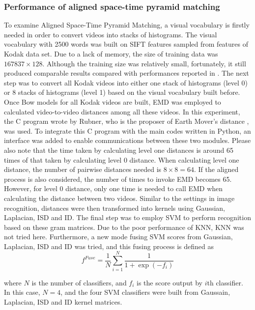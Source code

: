 \subsubsection{Performance of aligned space-time pyramid matching}
To examine Aligned Space-Time Pyramid Matching, a visual vocabulary is firstly needed in order to convert videos into stacks of histograms. The visual vocabulary with 2500 words was built on SIFT features sampled from features of Kodak data set. Due to a lack of memory, the size of training data was $167837 \times 128$. Although the training size was relatively small, fortunately, it still produced comparable results compared with performances reported in \cite{duan2012visual}. The next step was to convert all Kodak videos into either one stack of histograms (level 0) or 8 stacks of histograms (level 1) based on the visual vocabulary built before. Once Bow models for all Kodak videos are built, EMD was employed to calculated video-to-video distances among all these videos. In this experiment, the C program wrote by Rubner, who is the proposer of Earth Mover's distance \cite{rubner2000earth}, was used. To integrate this C program with the main codes written in Python, an interface was added to enable communications between these two modules. Please also note that the time taken by calculating level one distances is around 65 times of that taken by calculating level 0 distance. When calculating level one distance, the number of pairwise distances needed is $8 \times 8 = 64$. If the aligned process is also considered, the number of times to invoke EMD becomes 65. However, for level 0 distance, only one time is needed to call EMD when calculating the distance between two videos. Similar to the settings in image recognition, distances were then transformed into kernels using Gaussian, Laplacian, ISD and ID. The final step was to employ SVM to perform recognition based on these gram matrices. Due to the poor performance of KNN, KNN was not tried here. Furthermore, a new mode fusing SVM scores from Gaussian, Laplacian, ISD and ID was tried, and this fusing process is defined as
\begin{equation}
f^{Fuse} = \frac{1}{N} \sum_{i=1}^{N} \frac{1}{1 +\exp{(-f_i)}}
\end{equation}

\noindent where $N$ is the number of classifiers, and $f_i$ is the score output by $i$th classifier. In this case, $N = 4$, and the four SVM classifiers were built from Gaussain, Laplacian, ISD and ID kernel matrices. \\

